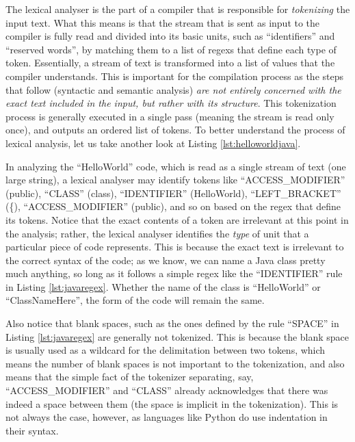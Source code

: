 The lexical analyser is the part of a compiler that is responsible for \emph{tokenizing} the input text. What this means is that the stream that is sent as input to the compiler is fully read and divided into its basic units, such as ``identifiers'' and ``reserved words'', by matching them to a list of \gls{regex}s that define each type of token. Essentially, a stream of text is transformed into a list of values that the compiler understands. This is important for the compilation process as the steps that follow (syntactic and semantic analysis) \emph{are not entirely concerned with the exact text included in the input, but rather with its structure}. This tokenization process is generally executed in a single pass (meaning the stream is read only once), and outputs an ordered list of tokens. To better understand the process of lexical analysis, let us take another look at Listing \ref{lst:helloworldjava}.

In analyzing the ``HelloWorld'' code, which is read as a single stream of text (one large string), a lexical analyser may identify tokens like ``ACCESS_MODIFIER'' (public), ``CLASS'' (class), ``IDENTIFIER'' (HelloWorld), ``LEFT_BRACKET'' (\{), ``ACCESS_MODIFIER'' (public), and so on based on the \gls{regex} that define its tokens. Notice that the exact contents of a token are irrelevant at this point in the analysis; rather, the lexical analyser identifies the \emph{type} of unit that a particular piece of code represents. This is because the exact text is irrelevant to the correct syntax of the code; as we know, we can name a Java class pretty much anything, so long as it follows a simple \gls{regex} like the ``IDENTIFIER'' rule in Listing \ref{lst:javaregex}. Whether the name of the class is ``HelloWorld'' or ``ClassNameHere'', the form of the code will remain the same.

Also notice that blank spaces, such as the ones defined by the rule ``SPACE'' in Listing \ref{lst:javaregex} are generally not tokenized. This is because the blank space is usually used as a wildcard for the delimitation between two tokens, which means the number of blank spaces is not important to the tokenization, and also means that the simple fact of the tokenizer separating, say, ``ACCESS_MODIFIER'' and ``CLASS'' already acknowledges that there was indeed a space between them (the space is implicit in the tokenization). This is not always the case, however, as languages like Python do use indentation in their syntax.

